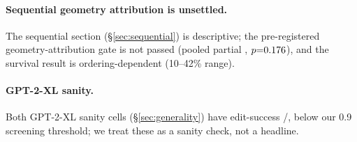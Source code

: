 \paragraph{Sequential geometry attribution is unsettled.} The sequential
section (\S\ref{sec:sequential}) is descriptive; the pre-registered
geometry-attribution gate is not passed (pooled partial \seqHone{},
$p{=}0.176{}$), and the survival result is ordering-dependent
(10--42\% range).

\paragraph{GPT-2-XL sanity.} Both GPT-2-XL sanity cells (\S\ref{sec:generality})
have edit-success \gptEsrL{}/\gptEsrH{}, below our 0.9 screening threshold; we
treat these as a sanity check, not a headline.
